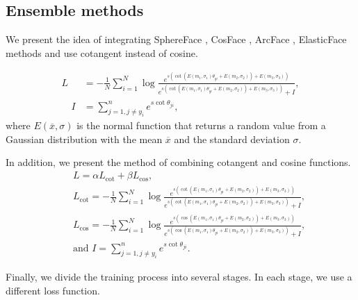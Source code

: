 \subsection{Ensemble methods}
We present the idea of integrating SphereFace \cite{liu2017sphereface}, CosFace \cite{wang2018cosface}, ArcFace \cite{deng2019arcface}, ElasticFace \cite{boutros2022elasticface} methods and use cotangent instead of cosine. 

\begin{equation}
\label{eq:ensemble}
\begin{split}
    L&=-\frac{1}{N}\sum\limits_{i=1}^{N}{\log }\frac{{{e}^{s\left( \cot \left( E\left( {{m}_{1}},{{\sigma }_{1}} \right){{\theta }_{yi}}+E\left( {{m}_{2}},{{\sigma }_{2}} \right) \right)+E\left( {{m}_{3}},{{\sigma }_{3}} \right) \right)}}}{{{e}^{s\left( \cot \left( E\left( {{m}_{1}},{{\sigma }_{1}} \right){{\theta }_{yi}}+E\left( {{m}_{2}},{{\sigma }_{2}} \right) \right)+E\left( {{m}_{3}},{{\sigma }_{3}} \right) \right)}}+I}, \\ \quad
    I&=\sum\limits_{j=1,j\ne {{y}_{i}}}^{n}{{{e}^{s\cot {{\theta }_{ji}}}}},
\end{split}
\end{equation}
where $E\left( \overline{x},\sigma  \right)$ is the normal function that returns a random value from a Gaussian distribution with the mean $\overline{x}$ and the standard deviation $\sigma $.

In addition, we present the method of combining cotangent and cosine functions.
\begin{equation}
    \begin{split}
        &L=\alpha {{L}_{\cot }}+\beta {{L}_{\cos }}, \\ \quad
        &{{L}_{\cot }} =-\frac{1}{N}\sum\limits_{i=1}^{N}{\log }\frac{{{e}^{s\left( \cot \left( E\left( {{m}_{1}},{{\sigma }_{1}} \right){{\theta }_{yi}}+E\left( {{m}_{2}},{{\sigma }_{2}} \right) \right)+E\left( {{m}_{3}},{{\sigma }_{3}} \right) \right)}}}{{{e}^{s\left( \cot \left( E\left( {{m}_{1}},{{\sigma }_{1}} \right){{\theta }_{yi}}+E\left( {{m}_{2}},{{\sigma }_{2}} \right) \right)+E\left( {{m}_{3}},{{\sigma }_{3}} \right) \right)}}+I}, \\ \quad
        &{{L}_{\cos }} =-\frac{1}{N}\sum\limits_{i=1}^{N}{\log }\frac{{{e}^{s\left( \cos \left( E\left( {{m}_{1}},{{\sigma }_{1}} \right){{\theta }_{yi}}+E\left( {{m}_{2}},{{\sigma }_{2}} \right) \right)+E\left( {{m}_{3}},{{\sigma }_{3}} \right) \right)}}}{{{e}^{s\left( \cos \left( E\left( {{m}_{1}},{{\sigma }_{1}} \right){{\theta }_{yi}}+E\left( {{m}_{2}},{{\sigma }_{2}} \right) \right)+E\left( {{m}_{3}},{{\sigma }_{3}} \right) \right)}}+I}, \\ \quad
        &\text{and } I =\sum\limits_{j=1,j\ne {{y}_{i}}}^{n}{{{e}^{s\cot {{\theta }_{ji}}}}}.
    \end{split}
\end{equation}

Finally, we divide the training process into several stages. In each stage, we use a different loss function.
